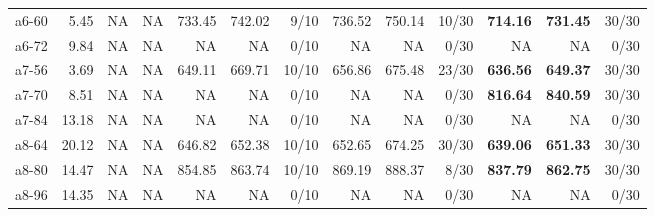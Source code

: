 \documentclass[aspectratio=1610]{beamer}
\begin{document}
\begin{frame}
\begin{table}[]
{\begin{tabular}{lrrrrrrrrrrrr}
a6-60                                          & 5.45                                                         & NA      & \multicolumn{1}{r|}{NA}       & 733.45  & 742.02   & \multicolumn{1}{r|}{9/10}  & 736.52  & 750.14   & \multicolumn{1}{r|}{10/30} & \textbf{714.16}  & {\color[HTML]{FE0000} \textbf{731.45}}  & 30/30 \\
a6-72                                          & 9.84                                                         & NA      & \multicolumn{1}{r|}{NA}       & NA      & NA       & \multicolumn{1}{r|}{0/10}  & NA      & NA       & \multicolumn{1}{r|}{0/30}  & NA               & NA                                      & 0/30  \\
a7-56                                          & 3.69                                                         & NA      & \multicolumn{1}{r|}{NA}       & 649.11  & 669.71   & \multicolumn{1}{r|}{10/10} & 656.86  & 675.48   & \multicolumn{1}{r|}{23/30} & \textbf{636.56}  & {\color[HTML]{FE0000} \textbf{649.37}}  & 30/30 \\
a7-70                                          & 8.51                                                         & NA      & \multicolumn{1}{r|}{NA}       & NA      & NA       & \multicolumn{1}{r|}{0/10}  & NA      & NA       & \multicolumn{1}{r|}{0/30}  & \textbf{816.64}  & {\color[HTML]{FE0000} \textbf{840.59}}  & 30/30 \\
a7-84                                          & 13.18                                                        & NA      & \multicolumn{1}{r|}{NA}       & NA      & NA       & \multicolumn{1}{r|}{0/10}  & NA      & NA       & \multicolumn{1}{r|}{0/30}  & NA               & NA                                      & 0/30  \\
a8-64                                          & 20.12                                                        & NA      & \multicolumn{1}{r|}{NA}       & 646.82  & 652.38   & \multicolumn{1}{r|}{10/10} & 652.65  & 674.25   & \multicolumn{1}{r|}{30/30} & \textbf{639.06}  & {\color[HTML]{FE0000} \textbf{651.33}}  & 30/30 \\
a8-80                                          & 14.47                                                        & NA      & \multicolumn{1}{r|}{NA}       & 854.85  & 863.74   & \multicolumn{1}{r|}{10/10} & 869.19  & 888.37   & \multicolumn{1}{r|}{8/30}  & \textbf{837.79}  & {\color[HTML]{FE0000} \textbf{862.75}}  & 30/30 \\
a8-96                                          & 14.35                                                        & NA      & \multicolumn{1}{r|}{NA}       & NA      & NA       & \multicolumn{1}{r|}{0/10}  & NA      & NA       & \multicolumn{1}{r|}{0/30}  & NA               & NA                                      & 0/30  \\ 

\end{tabular}}
\end{table}
\end{frame}
\end{document}
